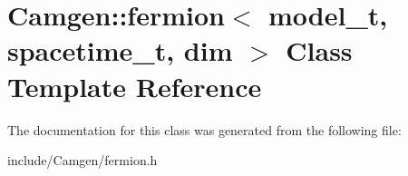 \hypertarget{a00217}{\section{Camgen\-:\-:fermion$<$ model\-\_\-t, spacetime\-\_\-t, dim $>$ Class Template Reference}
\label{a00217}
}


The documentation for this class was generated from the following file\-:\begin{DoxyCompactItemize}
\item 
include/\-Camgen/fermion.\-h\end{DoxyCompactItemize}
